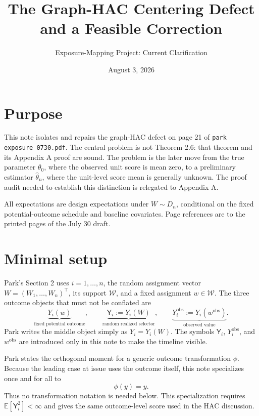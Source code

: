\documentclass[11pt]{article}
\title{The Graph-HAC Centering Defect and a Feasible Correction}
\author{Exposure-Mapping Project: Current Clarification}
\date{August 3, 2026}
\newcommand{\E}{\mathbb E}
\newcommand{\obs}{\mathrm{obs}}
\begin{document}
\maketitle

\section*{Purpose}

This note isolates and repairs the graph-HAC defect on page 21 of
\texttt{park exposure 0730.pdf}. The central problem is not Theorem 2.6: that
theorem and its Appendix A proof are sound. The problem is the later move from
the true parameter \(\theta_0\), where the observed unit score is mean zero, to
a preliminary estimator \(\widehat\theta_n\), where the unit-level score mean
is generally unknown. The proof audit needed to establish this distinction is
relegated to Appendix A.

All expectations are design expectations under \(W\sim D_n\), conditional on
the fixed potential-outcome schedule and baseline covariates. Page references
are to the printed pages of the July 30 draft.

\section{Minimal setup}

Park's Section 2 uses \(i=1,\ldots,n\), the random assignment vector
\(W=(W_1,\ldots,W_n)^\top\), its support \(\mathcal W\), and a fixed assignment
\(w\in\mathcal W\). The three outcome objects that must not be conflated are
\[
 \underbrace{Y_i(w)}_{\text{fixed potential outcome}},\qquad
 \underbrace{\mathsf{Y}_i:=Y_i(W)}_{\text{random realized selector}},\qquad
 \underbrace{Y_i^{\obs}:=Y_i(w^{\obs})}_{\text{observed value}}.
\]
Park writes the middle object simply as \(Y_i=Y_i(W)\). The symbols
\(\mathsf{Y}_i\), \(Y_i^{\obs}\), and \(w^{\obs}\) are introduced only in this
note to make the timeline visible.

Park states the orthogonal moment for a generic outcome transformation
\(\phi\). Because the leading case at issue uses the outcome itself, this note
specializes once and for all to
\[
 \phi(y)=y.
\]
Thus no transformation notation is needed below. This specialization requires
\(\E[\mathsf{Y}_i^2]<\infty\) and gives the same outcome-level score used in the
HAC discussion.
\end{document}

